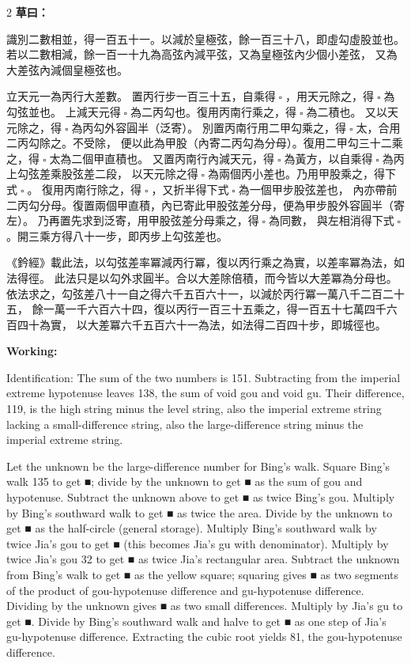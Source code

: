 \documentclass[11pt,a4paper]{article}
\let\origsquare\square
\renewcommand{\square}{\ensuremath{\origsquare}}%
\newcommand{\tsaoyue}[1]{%
  \noindent\textcolor{workcolor}{\textbf{草曰：}}{\tradfont #1}\par%
}
\newcommand{\tsaoyueeng}[1]{%
  \noindent\textcolor{engcolor}{\textbf{Working: }}{\small #1}\par%
}
\begin{document}
\begin{paracol}{2}
\tsaoyue{%
識別二數相並，得一百五十一。以減於皇極弦，餘一百三十八，即虛勾虛股並也。
若以二數相減，餘一百一十九為高弦內減平弦，又為皇極弦內少個小差弦，
又為大差弦內減個皇極弦也。

立天元一為丙行大差數。
置丙行步一百三十五，自乘得$ \; \square \; $，用天元除之，得$ \; \square \; $為勾弦並也。
上減天元得$ \; \square \; $為二丙勾也。復用丙南行乘之，得$ \; \square \; $為二積也。
又以天元除之，得$ \; \square \; $為丙勾外容圓半（泛寄）。
別置丙南行用二甲勾乘之，得$ \; \square \; $太，合用二丙勾除之。不受除，
便以此為甲股（內寄二丙勾為分母）。復用二甲勾三十二乘之，得$ \; \square \; $太為二個甲直積也。
又置丙南行內減天元，得$ \; \square \; $為黃方，以自乘得$ \; \square \; $為丙上勾弦差乘股弦差二段，
以天元除之得$ \; \square \; $為兩個丙小差也。乃用甲股乘之，得下式$ \; \square \; $。
復用丙南行除之，得$ \; \square \; $，又折半得下式$ \; \square \; $為一個甲步股弦差也，
內亦帶前二丙勾分母。復置兩個甲直積，內已寄此甲股弦差分母，便為甲步股外容圓半（寄左）。
乃再置先求到泛寄，用甲股弦差分母乘之，得$ \; \square \; $為同數，
與左相消得下式$ \; \square \; $。開三乘方得八十一步，即丙步上勾弦差也。

《鈐經》載此法，以勾弦差率冪減丙行冪，復以丙行乘之為實，以差率冪為法，如法得徑。
此法只是以勾外求圓半。合以大差除倍積，而今皆以大差冪為分母也。
依法求之，勾弦差八十一自之得六千五百六十一，以減於丙行冪一萬八千二百二十五，
餘一萬一千六百六十四，復以丙行一百三十五乘之，得一百五十七萬四千六百四十為實，
以大差冪六千五百六十一為法，如法得二百四十步，即城徑也。}
\switchcolumn
\tsaoyueeng{%
Identification: The sum of the two numbers is 151. Subtracting from the imperial extreme hypotenuse leaves 138, the sum of void gou and void gu. Their difference, 119, is the high string minus the level string, also the imperial extreme string lacking a small-difference string, also the large-difference string minus the imperial extreme string.

Let the unknown be the large-difference number for Bing's walk. Square Bing's walk 135 to get ■; divide by the unknown to get ■ as the sum of gou and hypotenuse. Subtract the unknown above to get ■ as twice Bing's gou. Multiply by Bing's southward walk to get ■ as twice the area. Divide by the unknown to get ■ as the half-circle (general storage). Multiply Bing's southward walk by twice Jia's gou to get ■ (this becomes Jia's gu with denominator). Multiply by twice Jia's gou 32 to get ■ as twice Jia's rectangular area. Subtract the unknown from Bing's walk to get ■ as the yellow square; squaring gives ■ as two segments of the product of gou-hypotenuse difference and gu-hypotenuse difference. Dividing by the unknown gives ■ as two small differences. Multiply by Jia's gu to get ■. Divide by Bing's southward walk and halve to get ■ as one step of Jia's gu-hypotenuse difference. Extracting the cubic root yields 81, the gou-hypotenuse difference.

}
\end{paracol}
\end{document}
